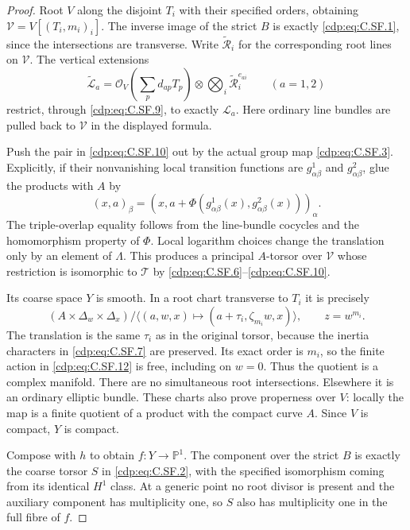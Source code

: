 \begin{proof}
Root $V$ along the disjoint
$T_i$ with their specified
orders, obtaining
$\mathcal V=V[(T_i,m_i)_i]$.
The inverse image of the strict
$B$ is exactly \eqref{cdp:eq:C.SF.1}, since
the intersections are transverse.
Write $\widetilde{\mathcal R}_i$
for the corresponding root lines
on $\mathcal V$. The vertical
extensions
\[
 \widetilde{\mathcal L}_a
   =\mathcal O_V\left(\sum_p d_{ap}T_p\right)
       \otimes\bigotimes_i
                       \widetilde{\mathcal R}_i^{e_{ai}}
                          \qquad(a=1,2)
                                                               \tag{C.SF.10}\label{cdp:eq:C.SF.10}
\]
restrict, through \eqref{cdp:eq:C.SF.9}, to
exactly $\mathcal L_a$. Here
ordinary line bundles are pulled
back to $\mathcal V$ in the
displayed formula.

Push the pair in \eqref{cdp:eq:C.SF.10}
out by the actual group map
\eqref{cdp:eq:C.SF.3}. Explicitly, if their
nonvanishing local transition
functions are $g^1_{\alpha\beta}$
and $g^2_{\alpha\beta}$, glue
the products with $A$ by
\[
 (x,a)_\beta=(x,a+
     \Phi(g^1_{\alpha\beta}(x),
          g^2_{\alpha\beta}(x)))_\alpha.
                                                               \tag{C.SF.11}\label{cdp:eq:C.SF.11}
\]
The triple-overlap equality follows
from the line-bundle cocycles and
the homomorphism property of $\Phi$.
Local logarithm choices change the
translation only by an element
of $\Lambda$. This produces a
principal $A$-torsor over
$\mathcal V$ whose restriction
is isomorphic to $\mathcal T$
by \eqref{cdp:eq:C.SF.6}--\eqref{cdp:eq:C.SF.10}.

Its coarse space $Y$ is smooth.
In a root chart transverse to
$T_i$ it is precisely
\[
 (A\times\Delta_w\times\Delta_x)/
 \langle(a,w,x)\mapsto
             (a+\tau_i,\zeta_{m_i}w,x)\rangle,
 \qquad z=w^{m_i}.
                                                               \tag{C.SF.12}\label{cdp:eq:C.SF.12}
\]
The translation is the same
$\tau_i$ as in the original
torsor, because the inertia
characters in \eqref{cdp:eq:C.SF.7} are
preserved. Its exact order
is $m_i$, so the finite action
in \eqref{cdp:eq:C.SF.12} is free, including
on $w=0$. Thus the quotient
is a complex manifold. There
are no simultaneous root
intersections. Elsewhere it
is an ordinary elliptic bundle.
These charts also prove
properness over $V$: locally
the map is a finite quotient
of a product with the compact
curve $A$. Since $V$ is
compact, $Y$ is compact.

Compose with $h$ to obtain
$f:Y\to\mathbb P^1$.
The component over the strict
$B$ is exactly the coarse
torsor $S$ in \eqref{cdp:eq:C.SF.2}, with
the specified isomorphism
coming from its identical
$H^1$ class. At a generic
point no root divisor is
present and the auxiliary
component has multiplicity
one, so $S$ also has
multiplicity one in the
full fibre of $f$.


\end{proof}
